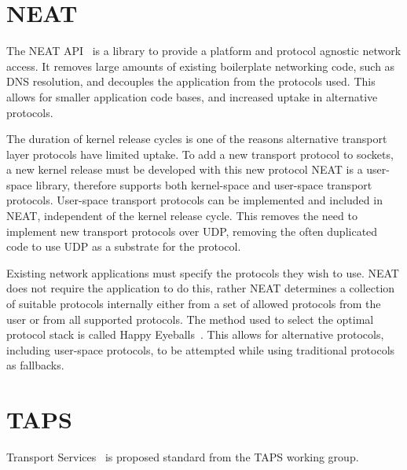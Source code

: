 \section{NEAT}\label{sec:neat}
The NEAT API~\citep{khademi_neatplatformprotocolindependent_2017} is a library to provide a platform and protocol
agnostic network access.
It removes large amounts of existing boilerplate networking code, such as DNS resolution, and decouples the application
from the protocols used.
This allows for smaller application code bases, and increased uptake in alternative protocols.

The duration of kernel release cycles is one of the reasons alternative transport layer protocols have limited uptake.
To add a new transport protocol to sockets, a new kernel release must be developed with this new protocol
NEAT is a user-space library, therefore supports both kernel-space and user-space transport protocols.
User-space transport protocols can be implemented and included in NEAT, independent of the kernel release cycle.
This removes the need to implement new transport protocols over UDP, removing the often duplicated code to use UDP
as a substrate for the protocol.

Existing network applications must specify the protocols they wish to use.
NEAT does not require the application to do this, rather NEAT determines a collection of suitable protocols internally
either from a set of allowed protocols from the user or from all supported protocols.
The method used to select the optimal protocol stack is called Happy Eyeballs~\citep{pauly_happyeyeballsversion_}.
This allows for alternative protocols, including user-space protocols, to be attempted while using traditional protocols
as fallbacks.

\section{TAPS}\label{sec:taps}
Transport Services~\citep{pauly_architecturetransportservices_2020} is proposed standard from the TAPS working group.


